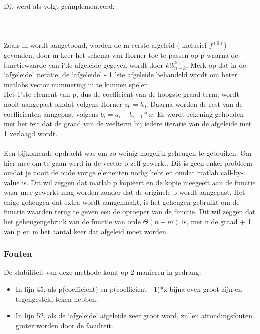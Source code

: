 \documentclass[a4paper,kulak]{kulakarticle}
\begin{document}
Dit werd als volgt geïmplementeerd:\\



~\\~\\~\\
Zoals in \cite{bultheel2006inleiding} wordt aangetoond, worden de m eerste afgeleid ( inclusief $f^{(0)}$) gevonden, door m keer het schema van Horner toe te passen op p waarna de functiewaarde van i'de afgeleide gegeven wordt door $k!b^{k+1}_{n-k}$. Merk op dat in de `afgeleide' iteratie, de `afgeleide' - 1 'ste afgeleide behandeld wordt om beter matlabs vector nummering in te kunnen spelen.\\
Het 1'ste element van p, dus de coefficient van de hoogste graad term, wordt nooit aangepast omdat volgens Horner $a_0 = b_0$. Daarna worden de rest van de coefficienten aangepast volgens $b_i = a_i + b_{i-1}*x$. Er wordt rekening gehouden met het feit dat de graad van de veelterm bij iedere iteratie van de afgeleide met 1 verlaagd wordt.
~\\~\\Een bijkomende opdracht was om zo weinig mogelijk geheugen te gebruiken. Om hier mee om te gaan werd in de vector p zelf gewerkt. Dit is geen enkel probleem omdat je nooit de oude vorige elementen nodig hebt en omdat matlab call-by-value is. Dit wil zeggen dat matlab p kopieert en de kopie meegeeft aan de functie waar mee gewerkt mag worden zonder dat de originele p wordt aangepast. 
Het enige geheugen dat extra wordt aangemaakt, is het geheugen gebruikt om de functie waarden terug te geven een de oproeper van de functie.
Dit wil zeggen dat het geheugengebruik van de functie van orde $\Theta( n + m )$ is, met n de graad + 1 van p en m het aantal keer dat afgeleid moet worden.

\subsubsection{Fouten}

De stabiliteit van deze methode komt op 2 manieren in gedrang:
\begin{itemize}
	\item In lijn 45, als p(coefficient) en p(coefficient - 1)*x bijna even groot zijn en tegengesteld teken hebben.
	\item In lijn 52, als de `afgeleide' afgeleide zeer groot word, zullen afrondingsfouten groter worden door de faculteit.
\end{itemize}
\end{document}
